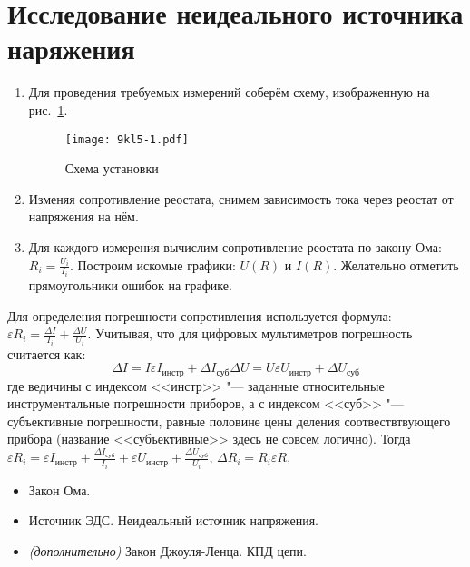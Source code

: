 \section{Исследование неидеального источника наряжения}
\SolveVariant
\begin{enumerate}
    \item Для проведения требуемых измерений соберём схему, изображенную на рис.~\ref{fig:9kl5:sch}.
    \begin{figure}[h]
        \centering
        \texttt{[image: 9kl5-1.pdf]}
        \caption{Схема установки}
        \label{fig:9kl5:sch}
    \end{figure}
    \item Изменяя сопротивление реостата, снимем зависимость тока через реостат от напряжения на нём.
    \item Для каждого измерения вычислим сопротивление реостата по закону Ома: \(R_i=\frac{U_i}{I_i}\). Построим искомые графики: \(U(R)\) и \(I(R)\). Желательно отметить прямоугольники ошибок на графике.
\end{enumerate}
\MesErrors
Для определения погрешности сопротивления используется формула: \(\varepsilon R_i=\frac{\Delta I}{I_i}+\frac{\Delta U}{U_i}\). Учитывая, что для цифровых мультиметров погрешность считается как:
\begin{equation*}
    \Delta I = I\varepsilon I_\text{инстр} + \Delta I_\text{суб}
    \Delta U = U\varepsilon U_\text{инстр} + \Delta U_\text{суб}
\end{equation*}
    где ведичины с индексом <<инстр>> "--- заданные относительные инструментальные погрешности приборов, а с индексом <<суб>> "--- субъективные погрешности, равные половине цены деления соотвествтвующего прибора (название <<субъективные>> здесь не совсем логично).
    Тогда \( \varepsilon R_i = \varepsilon I_\text{инстр}+\frac{\Delta I_\text{суб}}{I_i}+\varepsilon U_\text{инстр} +\frac{\Delta U_\text{суб}}{U_i} \), \(\Delta R_i = R_i\varepsilon R \).
\SchoolBase
\begin{itemize}
    \item Закон Ома.
    \item Источник ЭДС. Неидеальный источник напряжения.
    \item \textit{(дополнительно)} Закон Джоуля-Ленца. КПД цепи.
\end{itemize}
